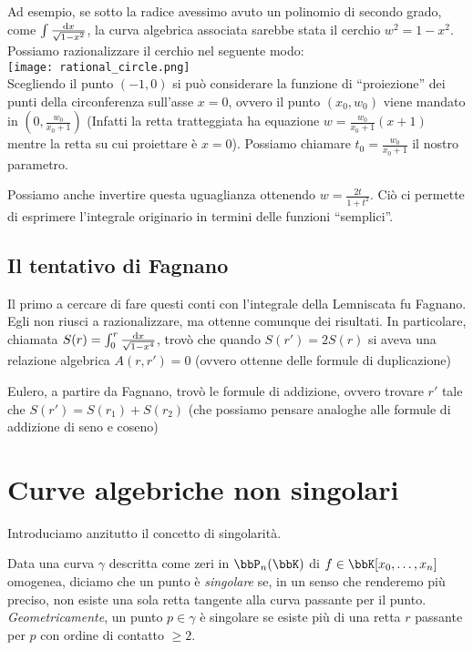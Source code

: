 Ad esempio, se sotto la radice avessimo avuto un polinomio di secondo grado, come $ \int \frac{\text{d} x}{\sqrt{1 - x^2}} $, la curva algebrica
associata sarebbe stata il cerchio $w^2 = 1 - x^2$. Possiamo razionalizzare il cerchio nel seguente modo:\\
\texttt{[image: rational\_circle.png]}\\
Scegliendo il punto $(-1, 0)$ si può considerare la funzione di ``proiezione'' dei punti della circonferenza sull'asse $x=0$, ovvero il
punto $(x_0, w_0)$ viene mandato in $(0, \frac{w_0}{x_0 + 1})$ (Infatti la retta tratteggiata ha equazione $w = \frac{w_0}{x_0 + 1} (x + 1)$
mentre la retta su cui proiettare è $x=0$). Possiamo chiamare $t_0 = \frac{w_0}{x_0 + 1}$ il nostro parametro.

Possiamo anche invertire questa uguaglianza ottenendo $w = \frac{2 t}{1 + t^2}$. Ciò ci permette di esprimere l'integrale originario in termini delle funzioni ``semplici''.



\subsection{Il tentativo di Fagnano}
Il primo a cercare di fare questi conti con l'integrale della Lemniscata fu Fagnano. Egli non riusci a razionalizzare, ma ottenne comunque dei risultati. In particolare, chiamata $S(r) = \int_0^r \frac{\text{d} x}{\sqrt{1 - x^4}}$, trovò che quando $S(r') = 2 S(r)$ si aveva una relazione algebrica $A(r, r') = 0$ (ovvero ottenne delle formule di duplicazione)


Eulero, a partire da Fagnano, trovò le formule di addizione, ovvero trovare $r'$ tale che $S(r') = S(r_1) + S(r_2)$ (che possiamo pensare analoghe alle formule di addizione di seno e coseno)



\section{Curve algebriche non singolari}

Introduciamo anzitutto il concetto di singolarità.

Data una curva $\gamma$ descritta come zeri in $\bbP_n(\bbK)$ di $f \in \bbK[x_0, \ldots,x_n]$ omogenea, diciamo che un punto è
\textit{singolare} se, in un senso che renderemo più preciso, non esiste una sola retta tangente alla curva passante per il punto. \textit{Geometricamente}, un punto $p \in \gamma$ è singolare se esiste più di una retta $r$ passante per $p$ con ordine di contatto $\geq 2$. 
\vspace{1em}

